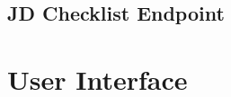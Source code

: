 \begin{appendices}
\section{JD Checklist Endpoint} \label{app:Endpoint}

\chapter{User Interface}

\end{appendices}
